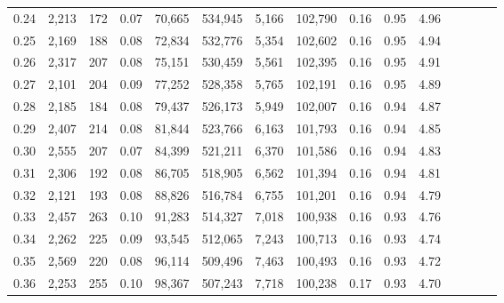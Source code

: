 \begin{tabular}{rrrcrrrrrrrrrrr}
0.24 &   2,213 &    172 &                                       0.07 &   70,665 &  534,945 &    5,166 &  102,790 &  0.16 &  0.95 &                         4.96 \\
0.25 &   2,169 &    188 &                                       0.08 &   72,834 &  532,776 &    5,354 &  102,602 &  0.16 &  0.95 &                         4.94 \\
0.26 &   2,317 &    207 &                                       0.08 &   75,151 &  530,459 &    5,561 &  102,395 &  0.16 &  0.95 &                         4.91 \\
0.27 &   2,101 &    204 &                                       0.09 &   77,252 &  528,358 &    5,765 &  102,191 &  0.16 &  0.95 &                         4.89 \\
0.28 &   2,185 &    184 &                                       0.08 &   79,437 &  526,173 &    5,949 &  102,007 &  0.16 &  0.94 &                         4.87 \\
0.29 &   2,407 &    214 &                                       0.08 &   81,844 &  523,766 &    6,163 &  101,793 &  0.16 &  0.94 &                         4.85 \\
0.30 &   2,555 &    207 &                                       0.07 &   84,399 &  521,211 &    6,370 &  101,586 &  0.16 &  0.94 &                         4.83 \\
0.31 &   2,306 &    192 &                                       0.08 &   86,705 &  518,905 &    6,562 &  101,394 &  0.16 &  0.94 &                         4.81 \\
0.32 &   2,121 &    193 &                                       0.08 &   88,826 &  516,784 &    6,755 &  101,201 &  0.16 &  0.94 &                         4.79 \\
0.33 &   2,457 &    263 &                                       0.10 &   91,283 &  514,327 &    7,018 &  100,938 &  0.16 &  0.93 &                         4.76 \\
0.34 &   2,262 &    225 &                                       0.09 &   93,545 &  512,065 &    7,243 &  100,713 &  0.16 &  0.93 &                         4.74 \\
0.35 &   2,569 &    220 &                                       0.08 &   96,114 &  509,496 &    7,463 &  100,493 &  0.16 &  0.93 &                         4.72 \\
0.36 &   2,253 &    255 &                                       0.10 &   98,367 &  507,243 &    7,718 &  100,238 &  0.17 &  0.93 &                         4.70 \\

\end{tabular}
